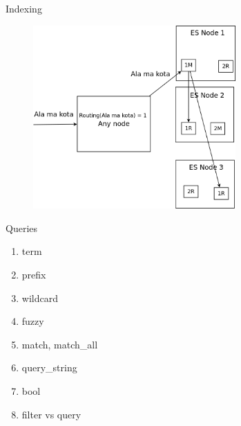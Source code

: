 \documentclass{beamer}
\begin{document}
\begin{frame}{Indexing}
	\begin{figure}
		\includegraphics[width=\textwidth,height=7cm,keepaspectratio=true]{indexing}
	\end{figure}
\end{frame}
\begin{frame}{Queries}
	\begin{enumerate}
		\item term
		\item prefix
		\item wildcard
		\item fuzzy
		\item match, match\_all
		\item query\_string
		\item bool
		\item filter vs query
	\end{enumerate}
\end{frame}
\end{document}
